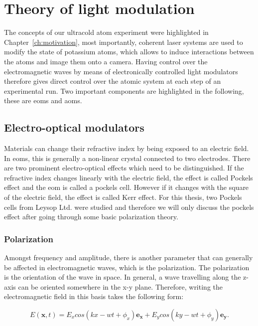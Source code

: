 \chapter{Theory of light modulation}

The concepts of our ultracold atom experiment were highlighted in \mbox{Chapter \ref{ch:motivation}}, most importantly, coherent laser systems are used to modify the state of potassium atoms, which allows to induce interactions between the atoms and image them onto a camera. Having control over the electromagnetic waves by means of electronically controlled light modulators therefore gives direct control over the atomic system at each step of an experimental run.
Two important components are highlighted in the following, these are \acp{eom} and \acp{aom}.

\section{Electro-optical modulators}
\label{sec:eom}


Materials can change their refractive index by being exposed to an electric field. In \acp{eom}, this is generally a non-linear crystal connected to two electrodes. There are two prominent electro-optical effects which need to be distinguished. If the refractive index changes linearly with the electric field, the effect is called Pockels effect and the \ac{eom} is called a pockels cell. However if it changes with the square of the electric field, the effect is called Kerr effect. For this thesis, two Pockels cells from Leysop Ltd. were studied and therefore we will only discuss the pockels effect after going through some basic polarization theory.

\subsection{Polarization}

\label{sec:pol}

Amongst frequency and amplitude, there is another parameter that can generally be affected in electromagnetic waves, which is the polarization. The polarization is the orientation of the wave in space. In general, a wave travelling along the z-axis can be oriented somewhere in the x-y plane. Therefore, writing the electromagnetic field in this basis takes the following form:

\begin{equation}
	E(\mathbf{x}, t) = E_x cos\left(kx - wt + \phi_x\right) \mathbf{e_x} + E_y cos\left(ky - wt + \phi_y\right) \mathbf{e_y} .
\end{equation}

